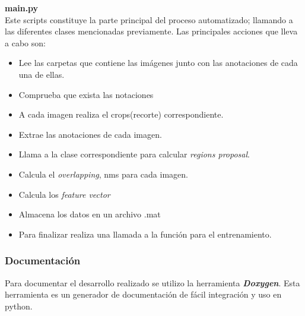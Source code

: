 \textbf{main.py}\\
Este scripts constituye la parte principal del proceso automatizado; llamando a las diferentes clases mencionadas previamente. Las principales 
acciones que lleva a cabo son:
\begin{itemize}
 \item Lee las carpetas que contiene las imágenes junto con las anotaciones de cada una de ellas.
 \item Comprueba que exista las notaciones
 \item A cada imagen realiza el crops(recorte) correspondiente.
 \item Extrae las anotaciones de cada imagen.
 \item Llama a la clase correspondiente para calcular \textit{regions proposal}.
 \item Calcula el \textit{overlapping}, \ac{nms} para cada imagen.
 \item Calcula los \textit{feature vector}
 \item Almacena los datos en un archivo .mat
 \item Para finalizar realiza una llamada a la función para el entrenamiento.
\end{itemize}

\subsubsection*{Documentación}\label{sub:documentacion}
Para documentar el desarrollo realizado se utilizo la herramienta \textbf{\textit{Doxygen}}. Esta herramienta es un generador de documentación de fácil integración y uso en python.